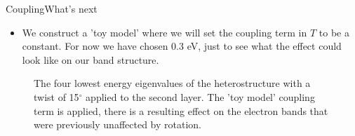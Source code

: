 \documentclass[9pt]{beamer}
\begin{document}
\begin{frame}{Coupling}{What's next}
  \begin{itemize}
    \item We construct a 'toy model' where we will set the coupling term in $T$ to be a constant. For now we have chosen 0.3 eV, just to see what the effect could look like on our band structure.
  \end{itemize}

  \begin{figure}
    \centering
    \caption{The four lowest energy eigenvalues of the heterostructure with a twist of 15$^\circ$ applied to the second layer. The 'toy model' coupling term is applied, there is a resulting effect on the electron bands that were previously unaffected by rotation.}
  \end{figure}
\end{frame}
\end{document}
